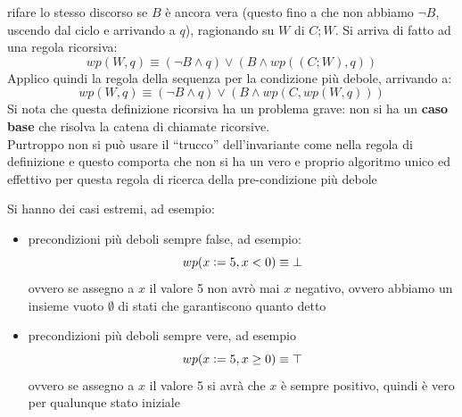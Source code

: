 \begin{itemize}
				      					      rifare lo stesso discorso se $B$ è ancora vera (questo fino a che non abbiamo $\neg
				      					      B$, uscendo dal ciclo e arrivando a $q$), ragionando su $W$ di $C;W$. Si
				      					      arriva di fatto ad una regola ricorsiva:
				      					      \[wp(W, q)\equiv(\neg B\land q)\lor(B\land wp((C;W), q))\]
				      					      Applico quindi la regola della sequenza per la condizione più debole,
				      					      arrivando a:
				      					      \[wp(W, q)\equiv(\neg B\land q)\lor(B\land wp(C, wp(W, q)))\]
				      					      Si nota che questa definizione ricorsiva ha un problema grave: non si ha un
				      					      \textbf{caso base} che risolva la catena di chiamate ricorsive.\\
				      					      Purtroppo non si può usare il ``trucco'' dell'invariante come nella regola di
				      					      definizione e questo comporta che non si ha un vero e proprio algoritmo unico
				      					      ed effettivo per questa regola di ricerca della pre-condizione più debole
				      				\end{itemize}
				      				Si hanno dei casi estremi, ad esempio:
				      				\begin{itemize}
				      					\item precondizioni più deboli sempre false, ad esempio:
				      					      \[wp(x\cceq5, x<0)\equiv\bot\]
				      					      ovvero se assegno a $x$ il valore 5 non avrò mai $x$ negativo,
				      					      ovvero abbiamo un insieme vuoto $\emptyset$ di stati che garantiscono quanto detto
				      					\item precondizioni più deboli sempre vere, ad esempio
				      					      \[wp(x\cceq 5, x\geq0)\equiv\top\]
				      					      ovvero se assegno a $x$ il valore 5 si avrà che $x$ è sempre
				      					      positivo, quindi è vero per qualunque stato iniziale
				      				\end{itemize}
